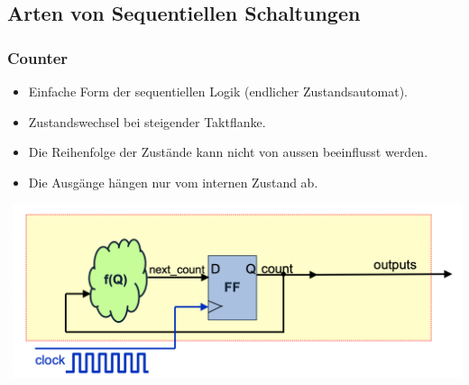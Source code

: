 \begin{center}
\begin{minipage}{0.4\linewidth}
\begin{center}
        \end{center}
    \end{minipage}
\end{center}

\subsection{Arten von Sequentiellen Schaltungen}
\subsubsection{Counter}
\begin{itemize}
	\item Einfache Form der sequentiellen Logik (endlicher Zustandsautomat).
	\item Zustandswechsel bei steigender Taktflanke.
	\item Die Reihenfolge der Zustände kann nicht von aussen beeinflusst werden.
	\item Die Ausgänge hängen nur vom internen Zustand ab.
\end{itemize}
\begin{center}
	\includegraphics[width=1\linewidth]{images/counter.png}
\end{center}
